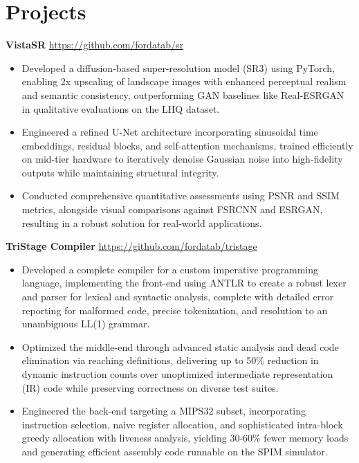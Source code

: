 \documentclass[11pt]{article}       %
\begin{document}
\vspace{-18.5pt}

\section*{Projects}


\textbf{VistaSR} \hfill \href{https://github.com/fordatab/sr}{https://github.com/fordatab/sr} \
\vspace{-10pt}
\begin{itemize}
\item Developed a diffusion-based super-resolution model (SR3) using PyTorch, enabling 2x upscaling of landscape images with enhanced perceptual realism and semantic consistency, outperforming GAN baselines like Real-ESRGAN in qualitative evaluations on the LHQ dataset.
\item Engineered a refined U-Net architecture incorporating sinusoidal time embeddings, residual blocks, and self-attention mechanisms, trained efficiently on mid-tier hardware to iteratively denoise Gaussian noise into high-fidelity outputs while maintaining structural integrity.
\item Conducted comprehensive quantitative assessments using PSNR and SSIM metrics, alongside visual comparisons against FSRCNN and ESRGAN, resulting in a robust solution for real-world applications.
\end{itemize}

\textbf{TriStage Compiler} \hfill \href{https://github.com/fordatab/tristage}{https://github.com/fordatab/tristage} \
\vspace{-10pt}
\begin{itemize}
\item Developed a complete compiler for a custom imperative programming language, implementing the front-end using ANTLR to create a robust lexer and parser for lexical and syntactic analysis, complete with detailed error reporting for malformed code, precise tokenization, and resolution to an unambiguous LL(1) grammar.
\item Optimized the middle-end through advanced static analysis and dead code elimination via reaching definitions, delivering up to 50\% reduction in dynamic instruction counts over unoptimized intermediate representation (IR) code while preserving correctness on diverse test suites.
\item Engineered the back-end targeting a MIPS32 subset, incorporating instruction selection, naive register allocation, and sophisticated intra-block greedy allocation with liveness analysis, yielding 30-60\% fewer memory loads and generating efficient assembly code runnable on the SPIM simulator. 
\end{itemize}
\end{document}
